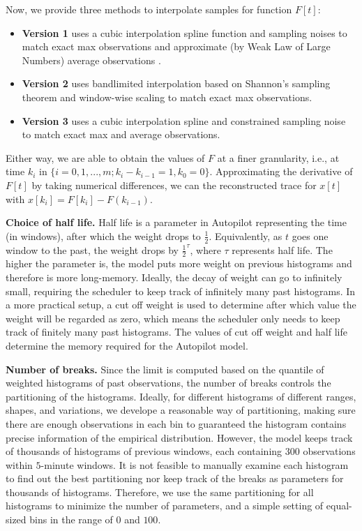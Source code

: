 \documentclass[sigplan,10pt,review,anonymous]{acmart}
\begin{document}
Now, we provide three methods to interpolate samples for function $F[t]$:
\begin{itemize}
    \item \textbf{Version 1} uses a cubic interpolation spline function and
    sampling noises to match exact max observations and approximate (by Weak Law
    of Large Numbers) average observations \cite{911175}.
    \item \textbf{Version 2} uses bandlimited interpolation based on Shannon's
    sampling theorem and window-wise scaling to match exact max observations.
    \item \textbf{Version 3} uses a cubic interpolation spline and constrained
    sampling noise to match exact max and average observations.
\end{itemize}

Either way, we are able to obtain the values of $F$ at a finer granularity,
i.e., at time $k_i$ in $\{i = 0, 1, ..., m; k_i - k_{i-1} = 1, k_0 = 0\}$.
Approximating the derivative of $F[t]$ by taking numerical differences, we can
the reconstructed trace for $x[t]$ with $x[k_i] = F[k_i] - F(k_{i-1})$.

\textbf{Choice of half life.} Half life is a parameter in Autopilot representing
the time (in windows), after which the weight drops to $\frac{1}{2}$.
Equivalently, as $t$ goes one window to the past, the weight drops by
${\frac{1}{2}}^{\tau}$, where $\tau$ represents half life. The higher the
parameter is, the model puts more weight on previous histograms and therefore is
more long-memory. Ideally, the decay of weight can go to infinitely small,
requiring the scheduler to keep track of infinitely many past histograms. In a
more practical setup, a cut off weight is used to determine after which value
the weight will be regarded as zero, which means the scheduler only needs to
keep track of finitely many past histograms. The values of cut off weight and
half life determine the memory required for the Autopilot model.

\textbf{Number of breaks.} Since the limit is computed based on the quantile of
weighted histograms of past observations, the number of breaks controls the
partitioning of the histograms. Ideally, for different histograms of different
ranges, shapes, and variations, we develope a reasonable way of partitioning,
making sure there are enough observations in each bin to guaranteed the
histogram contains precise information of the empirical distribution. However,
the model keeps track of thousands of histograms of previous windows, each
containing $300$ observations within $5$-minute windows. It is not feasible to
manually examine each histogram to find out the best partitioning nor keep track
of the breaks as parameters for thousands of histograms. Therefore, we use the
same partitioning for all histograms to minimize the number of parameters, and a
simple setting of equal-sized bins in the range of $0$ and $100$.
\end{document}
